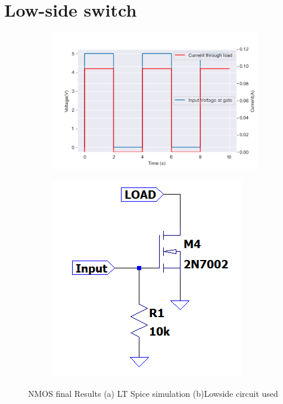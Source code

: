 \section{Low-side switch}
\label{sec:loadcontrol_results}
 \begin{figure}[!htb]
 \footnotesize
 \centering
    \begin{subfigure}[]{0.42\textwidth}
              \centering
  		\includegraphics[width=1\linewidth]{./Figures/NMOS.png}
		    \caption{} \label{subfig:nmosfig}
     \end{subfigure}
     \begin{subfigure}[]{0.3\textwidth}
             \centering
  		\includegraphics[width=1\linewidth]{./Figures/circNMOS.png}
		   \caption{ } \label{subfig:circnmos}
     \end{subfigure}
   \caption[{Fuse Characteristics}]{NMOS final Results   (a)  LT Spice simulation (b)Lowside circuit used }
    \label{fig:NMOScirc}
 \end{figure}
